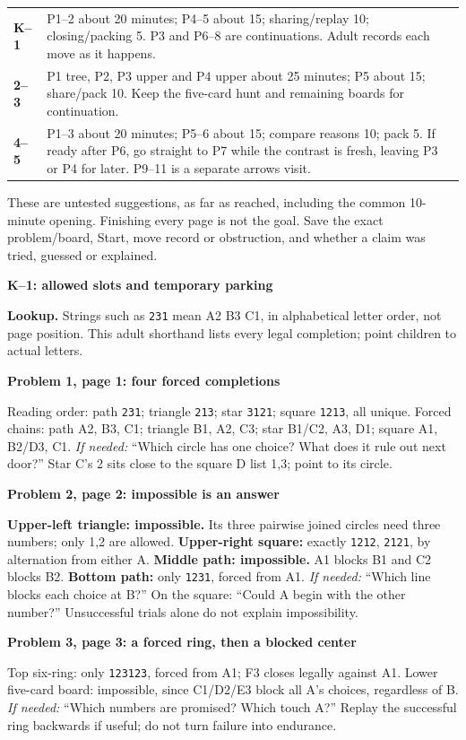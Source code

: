 \documentclass[10pt]{article}
\newcommand{\head}[1]{\par{\large\bfseries #1}\par}
\newcommand{\sub}[1]{\par\textbf{#1}\par}
\newcommand{\hint}[1]{\textit{If needed:} #1}
\newcommand{\word}[1]{\texttt{#1}}
\begin{document}
\begin{tabular}{p{.11\linewidth}p{.82\linewidth}}
\textbf{K--1} & P1--2 about 20 minutes; P4--5 about 15; sharing/replay 10; closing/packing 5. P3 and P6--8 are continuations. Adult records each move as it happens.\\[4pt]
\textbf{2--3} & P1 tree, P2, P3 upper and P4 upper about 25 minutes; P5 about 15; share/pack 10. Keep the five-card hunt and remaining boards for continuation.\\[4pt]
\textbf{4--5} & P1--3 about 20 minutes; P5--6 about 15; compare reasons 10; pack 5. If ready after P6, go straight to P7 while the contrast is fresh, leaving P3 or P4 for later. P9--11 is a separate arrows visit.\\
\end{tabular}\par
These are untested suggestions, as far as reached, including the common 10-minute opening. Finishing every page is not the goal. Save the exact problem/board, Start, move record or obstruction, and whether a claim was tried, guessed or explained.
\newpage
\head{K--1: allowed slots and temporary parking}
\textbf{Lookup.} Strings such as \word{231} mean A2 B3 C1, in alphabetical letter order, not page position. This adult shorthand lists every legal completion; point children to actual letters.

\sub{Problem 1, page 1: four forced completions}
Reading order: path \word{231}; triangle \word{213}; star \word{3121}; square \word{1213}, all unique. Forced chains: path A2, B3, C1; triangle B1, A2, C3; star B1/C2, A3, D1; square A1, B2/D3, C1. \hint{``Which circle has one choice? What does it rule out next door?''} Star C's 2 sits close to the square D list 1,3; point to its circle.

\sub{Problem 2, page 2: impossible is an answer}
\textbf{Upper-left triangle: impossible.} Its three pairwise joined circles need three numbers; only 1,2 are allowed. \textbf{Upper-right square:} exactly \word{1212}, \word{2121}, by alternation from either A. \textbf{Middle path: impossible.} A1 blocks B1 and C2 blocks B2. \textbf{Bottom path:} only \word{1231}, forced from A1. \hint{``Which line blocks each choice at B?'' On the square: ``Could A begin with the other number?''} Unsuccessful trials alone do not explain impossibility.

\sub{Problem 3, page 3: a forced ring, then a blocked center}
Top six-ring: only \word{123123}, forced from A1; F3 closes legally against A1. Lower five-card board: impossible, since C1/D2/E3 block all A's choices, regardless of B. \hint{``Which numbers are promised? Which touch A?''} Replay the successful ring backwards if useful; do not turn failure into endurance.
\end{document}
